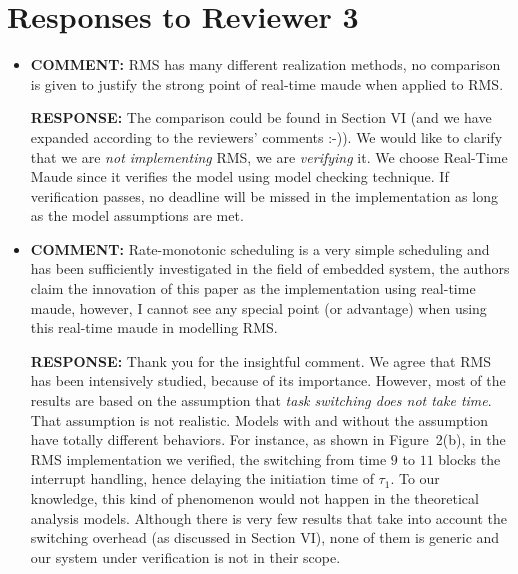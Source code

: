 \documentclass[10pt,journal]{IEEEtran}
\newcommand{\hide}[1]{\ignorespaces}
\newcommand{\ANSWER}{{\bf RESPONSE: }}
\newcommand{\COMMENT}{{\bf COMMENT: }}
\begin{document}
\section{Responses to Reviewer 3}
\begin{itemize}
\item
\COMMENT RMS has many different realization methods, no comparison is
given to justify the strong point of real-time maude when applied to
RMS.

\ANSWER The comparison could be found in Section VI (and we have
expanded according to the reviewers' comments :-)). We would like to
clarify that we are \emph{not implementing} RMS, we are
\emph{verifying} it. We choose Real-Time Maude since it verifies the
model using model checking technique. If verification passes, no
deadline will be missed in the implementation as long as the model
assumptions are met.

\hide{
The comparison is given in the related work section (Section
VI). We would say that we are not implementing RMS algorithm in
Real-Time Maude. In fact, we are using Real-Time Maude to model an
realistic implementation of RMS from an industrial avionic
system. There is no theoretical reason telling us that we have to use
Real-Time Maude to model the RMS implementation. However, the existing
verification work as far as we know cannot fit our needs, as discussed
in Section VI. Therefore, we developed the work in the paper, as a
piece of real work in the industry.
}

\item
\COMMENT Rate-monotonic scheduling is a very simple scheduling and has
been sufficiently investigated in the field of embedded system, the
authors claim the innovation of this paper as the implementation using
real-time maude, however, I cannot see any special point (or
advantage) when using this real-time maude in modelling RMS.

\ANSWER Thank you for the insightful comment. We agree that RMS has
been intensively studied, because of its importance. However, most of
the results are based on the assumption that \emph{task switching does
  not take time}. That assumption is not realistic. Models with and
without the assumption have totally different behaviors. For instance,
as shown in Figure~2(b), in the RMS implementation we verified, the
switching from time $9$ to $11$ blocks the interrupt handling, hence
delaying the initiation time of $\tau_1$. To our knowledge, this kind
of phenomenon would not happen in the theoretical analysis
models. Although there is very few results that take into account the
switching overhead (as discussed in Section VI), none of them is
generic and our system under verification is not in their scope.


\end{itemize}
\end{document}
